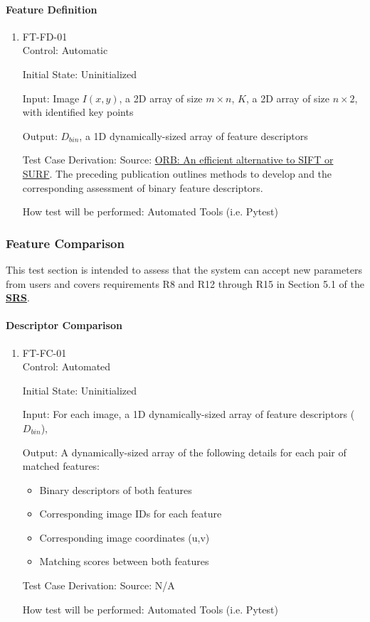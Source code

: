 \documentclass[12pt, titlepage]{article}
\begin{document}
\paragraph{Feature Definition}
\begin{enumerate}
\item{FT-FD-01\\}
Control: Automatic

Initial State: Uninitialized

Input: Image $I(x,y)$, a 2D array of size $ m \times n$, $K$, a 2D array of size $n \times 2$, 
with identified key points

Output: $D_{bin}$, a 1D dynamically-sized array of feature descriptors 

Test Case Derivation: Source: \href{https://sites.cc.gatech.edu/classes/AY2024/cs4475_summer/images/ORB_an_efficient_alternative_to_SIFT_or_SURF.pdf}
{ORB: An efficient alternative to SIFT or SURF}. The preceding publication outlines methods 
to develop and the corresponding assessment of binary feature descriptors.

How test will be performed: Automated Tools (i.e. Pytest)
\end{enumerate}



\subsubsection{Feature Comparison}

This test section is intended to assess that the system can accept new parameters from users and covers 
requirements R8 and R12 through R15 in Section 5.1 of the 
\textbf{\href{https://github.com/KiranSingh15/CAS-741-Image-Correspondences/blob/main/docs/SRS/SRS.pdf}
{SRS}}. 
		
\paragraph{Descriptor Comparison}
\begin{enumerate}
\item{FT-FC-01\\}
Control: Automated		

Initial State: Uninitialized

Input: For each image, a 1D dynamically-sized array of feature descriptors ($D_{bin}$), 

Output: A dynamically-sized array of the following details for each pair of matched features:
\begin{itemize}
\item Binary descriptors of both features
\item Corresponding image IDs for each feature
\item Corresponding image coordinates (u,v)
\item Matching scores between both features
\end{itemize}

Test Case Derivation: Source: N/A

How test will be performed: Automated Tools (i.e. Pytest)
\end{enumerate}
\end{document}
